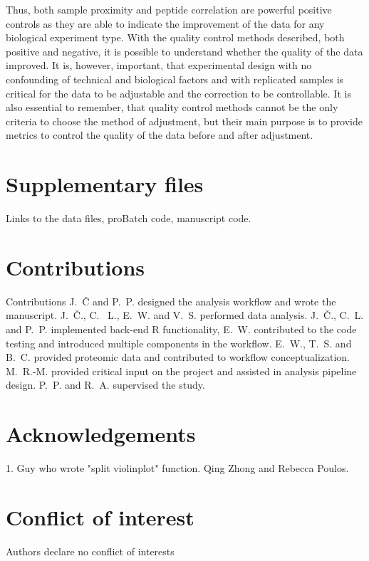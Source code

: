 \documentclass[num-refs]{wiley-article}
\begin{document}
Thus, both sample proximity and peptide correlation are powerful positive controls as they are able to indicate the improvement of the data for any biological experiment type.
With the quality control methods described, both positive and negative, it is possible to understand whether the quality of the data improved. It is, however, important, that experimental design with no confounding of technical and biological factors and with replicated samples is critical for the data to be adjustable and the correction to be controllable. It is also essential to remember, that quality control methods cannot be the only criteria to choose the method of adjustment, but their main purpose is to provide metrics to control the quality of the data before and after adjustment.






\section*{Supplementary files}
Links to the data files, proBatch code, manuscript code.

\section*{Contributions}

Contributions
J.~Č and P.~P. designed the analysis workflow and wrote the manuscript. J.~Č., C. ~L., E.~W. and V.~S. performed data analysis. J.~Č., C.~L. and P.~P. implemented back-end R functionality, E.~W. contributed to the code testing and introduced multiple components in the workflow. E.~W., T.~S. and B.~C. provided proteomic data and contributed to workflow conceptualization. M.~R.-M. provided critical input on the project and assisted in analysis pipeline design. P.~P. and R.~A. supervised the study.

\section*{Acknowledgements}
1. Guy who wrote "split violinplot" function. Qing Zhong and Rebecca Poulos.

\section*{Conflict of interest}
Authors declare no conflict of interests


\printendnotes
\end{document}
